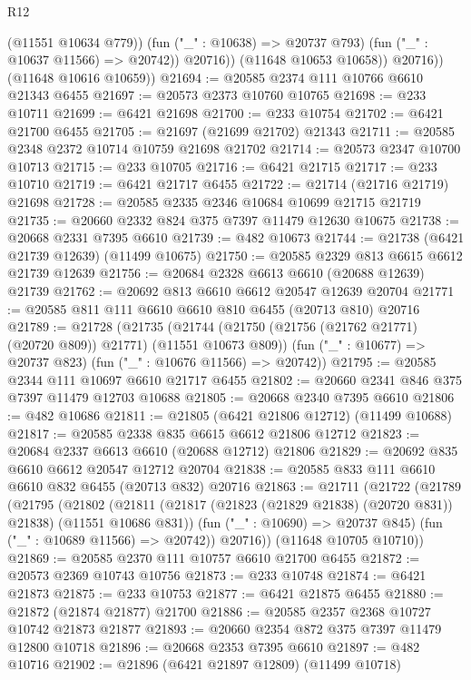 \begin{lexlean}{R12}
\begin{coremodule}
                    (@11551 @10634 @779))
                  (fun ("_" : @10638) => @20737 @793)
                  (fun ("_" : @10637 @11566) => @20742))
                @20716))
            (@11648 @10653 @10658))
          @20716))
      (@11648 @10616 @10659))
@21694 := @20585 @2374 @111 @10766 @6610 @21343 @6455
@21697 := @20573 @2373 @10760 @10765
@21698 := @233 @10711
@21699 := @6421 @21698
@21700 := @233 @10754
@21702 := @6421 @21700 @6455
@21705 := @21697 (@21699 @21702) @21343
@21711 := @20585 @2348 @2372 @10714 @10759 @21698 @21702
@21714 := @20573 @2347 @10700 @10713
@21715 := @233 @10705
@21716 := @6421 @21715
@21717 := @233 @10710
@21719 := @6421 @21717 @6455
@21722 := @21714 (@21716 @21719) @21698
@21728 := @20585 @2335 @2346 @10684 @10699 @21715 @21719
@21735 := @20660 @2332 @824 @375 @7397 @11479 @12630 @10675
@21738 := @20668 @2331 @7395 @6610
@21739 := @482 @10673
@21744 := @21738 (@6421 @21739 @12639) (@11499 @10675)
@21750 := @20585 @2329 @813 @6615 @6612 @21739 @12639
@21756 := @20684 @2328 @6613 @6610 (@20688 @12639) @21739
@21762 := @20692 @813 @6610 @6612 @20547 @12639 @20704
@21771 := @20585 @811 @111 @6610 @6610 @810 @6455 (@20713 @810) @20716
@21789 := @21728
    (@21735
      (@21744 (@21750 (@21756 (@21762 @21771) (@20720 @809)) @21771) (@11551 @10673 @809))
      (fun ("_" : @10677) => @20737 @823)
      (fun ("_" : @10676 @11566) => @20742))
@21795 := @20585 @2344 @111 @10697 @6610 @21717 @6455
@21802 := @20660 @2341 @846 @375 @7397 @11479 @12703 @10688
@21805 := @20668 @2340 @7395 @6610
@21806 := @482 @10686
@21811 := @21805 (@6421 @21806 @12712) (@11499 @10688)
@21817 := @20585 @2338 @835 @6615 @6612 @21806 @12712
@21823 := @20684 @2337 @6613 @6610 (@20688 @12712) @21806
@21829 := @20692 @835 @6610 @6612 @20547 @12712 @20704
@21838 := @20585 @833 @111 @6610 @6610 @832 @6455 (@20713 @832) @20716
@21863 := @21711
    (@21722
      (@21789
        (@21795
          (@21802
            (@21811 (@21817 (@21823 (@21829 @21838) (@20720 @831)) @21838) (@11551 @10686 @831))
            (fun ("_" : @10690) => @20737 @845)
            (fun ("_" : @10689 @11566) => @20742))
          @20716))
      (@11648 @10705 @10710))
@21869 := @20585 @2370 @111 @10757 @6610 @21700 @6455
@21872 := @20573 @2369 @10743 @10756
@21873 := @233 @10748
@21874 := @6421 @21873
@21875 := @233 @10753
@21877 := @6421 @21875 @6455
@21880 := @21872 (@21874 @21877) @21700
@21886 := @20585 @2357 @2368 @10727 @10742 @21873 @21877
@21893 := @20660 @2354 @872 @375 @7397 @11479 @12800 @10718
@21896 := @20668 @2353 @7395 @6610
@21897 := @482 @10716
@21902 := @21896 (@6421 @21897 @12809) (@11499 @10718)

\end{coremodule}
\end{lexlean}
